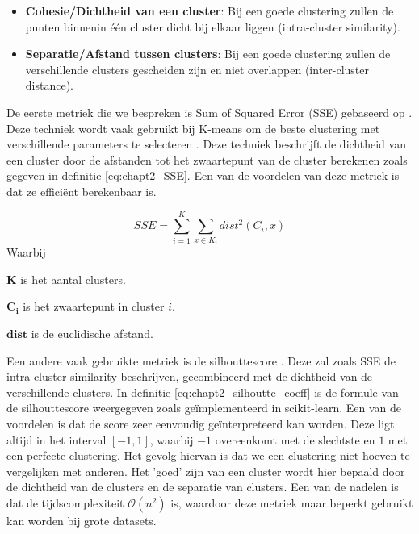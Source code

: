 \begin{itemize}
    \item \textbf{Cohesie/Dichtheid van een cluster}:  Bij een goede clustering zullen de punten binnenin één cluster dicht bij elkaar liggen (intra-cluster similarity).
    \item \textbf{Separatie/Afstand tussen clusters}: Bij een goede clustering zullen de verschillende clusters gescheiden zijn en niet overlappen (inter-cluster distance).
\end{itemize}

De eerste metriek die we bespreken is Sum of Squared Error (SSE) gebaseerd op \cite{cursus_ML_unsupervised}. Deze techniek wordt vaak gebruikt bij K-means om de beste clustering met verschillende parameters te selecteren \cite{sse_with_kmeans}. Deze techniek beschrijft de dichtheid van een cluster door de afstanden tot het zwaartepunt van de cluster berekenen zoals gegeven in definitie \ref{eq:chapt2_SSE}. Een van de voordelen van deze metriek is dat ze efficiënt berekenbaar is.

\begin{equation}
    SSE = \sum_{i=1}^{K}\sum_{x \in K_i} dist^2(C_i, x)
    \label{eq:chapt2_SSE}
\end{equation}
Waarbij
\begin{description}
    \item$\mathbf{K}$ is het aantal clusters.
    \item$\mathbf{C_i}$ is het zwaartepunt in cluster $i$.
    \item$\mathbf{dist}$ is de euclidische afstand.
\end{description}

Een andere vaak gebruikte metriek is de silhouttescore \cite{silhoutte_score_paper}. Deze zal zoals SSE de intra-cluster similarity beschrijven, gecombineerd met de dichtheid van de verschillende clusters. In definitie \ref{eq:chapt2_silhoutte_coeff} is de formule van de silhouttescore weergegeven zoals geïmplementeerd in scikit-learn. \cite{eval_metrics_scikit} Een van de voordelen is dat de score zeer eenvoudig geïnterpreteerd kan worden. Deze ligt altijd in het interval $[-1,1]$, waarbij $-1$ overeenkomt met de slechtste en $1$ met een perfecte clustering. Het gevolg hiervan is dat we een clustering niet hoeven te vergelijken met anderen. Het 'goed' zijn van een cluster wordt hier bepaald door de dichtheid van de clusters en de separatie van clusters. Een van de nadelen is dat de tijdscomplexiteit $\mathcal{O}(n^2)$ is, waardoor deze metriek maar beperkt gebruikt kan worden bij grote datasets.

